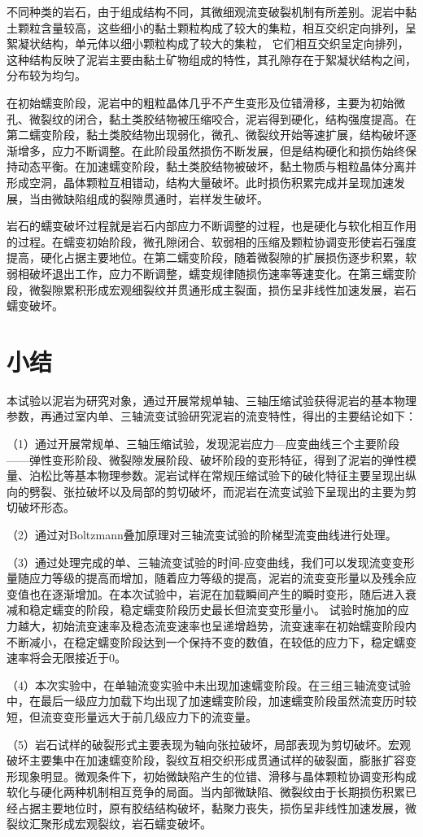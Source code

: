 不同种类的岩石，由于组成结构不同，其微细观流变破裂机制有所差别。泥岩中黏土颗粒含量较高，这些细小的黏土颗粒构成了较大的集粒，相互交织定向排列，呈絮凝状结构，单元体以细小颗粒构成了较大的集粒，
它们相互交织呈定向排列，这种结构反映了泥岩主要由黏土矿物组成的特性，其孔隙存在于絮凝状结构之间，分布较为均匀。

在初始蠕变阶段，泥岩中的粗粒晶体几乎不产生变形及位错滑移，主要为初始微孔、微裂纹的闭合，黏土类胶结物被压缩咬合，泥岩得到硬化，结构强度提高。在第二蠕变阶段，黏土类胶结物出现弱化，微孔、微裂纹开始等速扩展，结构破坏逐渐增多，应力不断调整。在此阶段虽然损伤不断发展，但是结构硬化和损伤始终保持动态平衡。在加速蠕变阶段，黏土类胶结物被破坏，黏土物质与粗粒晶体分离并形成空洞，晶体颗粒互相错动，结构大量破坏。此时损伤积累完成并呈现加速发展，当由微缺陷组成的裂隙贯通时，岩样发生破坏。

岩石的蠕变破坏过程就是岩石内部应力不断调整的过程，也是硬化与软化相互作用的过程。在蠕变初始阶段，微孔隙闭合、软弱相的压缩及颗粒协调变形使岩石强度提高，硬化占据主要地位。在第二蠕变阶段，随着微裂隙的扩展损伤逐步积累，软弱相破坏退出工作，应力不断调整，蠕变规律随损伤速率等速变化。在第三蠕变阶段，微裂隙累积形成宏观细裂纹并贯通形成主裂面，损伤呈非线性加速发展，岩石蠕变破坏。


\section{小结}
本试验以泥岩为研究对象，通过开展常规单轴、三轴压缩试验获得泥岩的基本物理参数，再通过室内单、三轴流变试验研究泥岩的流变特性，得出的主要结论如下：

（1）通过开展常规单、三轴压缩试验，发现泥岩应力—应变曲线三个主要阶段——弹性变形阶段、微裂隙发展阶段、破坏阶段的变形特征，得到了泥岩的弹性模量、泊松比等基本物理参数。泥岩试样在常规压缩试验下的破化特征主要呈现出纵向的劈裂、张拉破坏以及局部的剪切破坏，而泥岩在流变试验下呈现出的主要为剪切破坏形态。

（2）通过对Boltzmann叠加原理对三轴流变试验的阶梯型流变曲线进行处理。

（3）通过处理完成的单、三轴流变试验的时间-应变曲线，我们可以发现流变变形量随应力等级的提高而增加，随着应力等级的提高，泥岩的流变变形量以及残余应变值也在逐渐增加。在本次试验中，岩泥在加载瞬间产生的瞬时变形，随后进入衰减和稳定蠕变的阶段，稳定蠕变阶段历史最长但流变变形量小。
试验时施加的应力越大，初始流变速率及稳态流变速率也呈递增趋势，流变速率在初始蠕变阶段内不断减小，在稳定蠕变阶段达到一个保持不变的数值，在较低的应力下，稳定蠕变速率将会无限接近于0。

（4）本次实验中，在单轴流变实验中未出现加速蠕变阶段。在三组三轴流变试验中，在最后一级应力加载下均出现了加速蠕变阶段，加速蠕变阶段虽然流变历时较短，但流变变形量远大于前几级应力下的流变量。

（5）岩石试样的破裂形式主要表现为轴向张拉破坏，局部表现为剪切破坏。宏观破坏主要集中在加速蠕变阶段，裂纹互相交织形成贯通试样的破裂面，膨胀扩容变形现象明显。微观条件下，初始微缺陷产生的位错、滑移与晶体颗粒协调变形构成软化与硬化两种机制相互竞争的局面。当内部微缺陷、微裂纹由于长期损伤积累已经占据主要地位时，原有胶结结构破坏，黏聚力丧失，损伤呈非线性加速发展，微裂纹汇聚形成宏观裂纹，岩石蠕变破坏。









